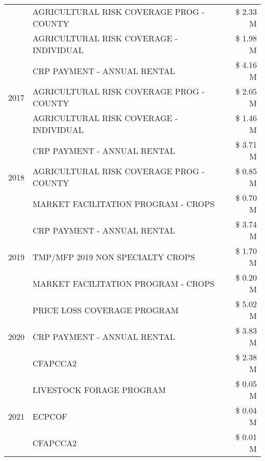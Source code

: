 \begin{tabular}{llr}
 & AGRICULTURAL RISK COVERAGE PROG - COUNTY & \$ 2.33 M \\
 & AGRICULTURAL RISK COVERAGE - INDIVIDUAL & \$ 1.98 M \\
\cline{1-3}
\multirow[t]{3}{*}{2017} & CRP PAYMENT - ANNUAL RENTAL & \$ 4.16 M \\
 & AGRICULTURAL RISK COVERAGE PROG - COUNTY & \$ 2.05 M \\
 & AGRICULTURAL RISK COVERAGE - INDIVIDUAL & \$ 1.46 M \\
\cline{1-3}
\multirow[t]{3}{*}{2018} & CRP PAYMENT - ANNUAL RENTAL & \$ 3.71 M \\
 & AGRICULTURAL RISK COVERAGE PROG - COUNTY & \$ 0.85 M \\
 & MARKET FACILITATION PROGRAM - CROPS & \$ 0.70 M \\
\cline{1-3}
\multirow[t]{3}{*}{2019} & CRP PAYMENT - ANNUAL RENTAL & \$ 3.74 M \\
 & TMP/MFP 2019 NON SPECIALTY CROPS & \$ 1.70 M \\
 & MARKET FACILITATION PROGRAM - CROPS & \$ 0.20 M \\
\cline{1-3}
\multirow[t]{3}{*}{2020} & PRICE LOSS COVERAGE PROGRAM & \$ 5.02 M \\
 & CRP PAYMENT - ANNUAL RENTAL & \$ 3.83 M \\
 & CFAPCCA2 & \$ 2.38 M \\
\cline{1-3}
\multirow[t]{3}{*}{2021} & LIVESTOCK FORAGE PROGRAM & \$ 0.05 M \\
 & ECPCOF & \$ 0.04 M \\
 & CFAPCCA2 & \$ 0.01 M \\
\cline{1-3}
\bottomrule
\end{tabular}
